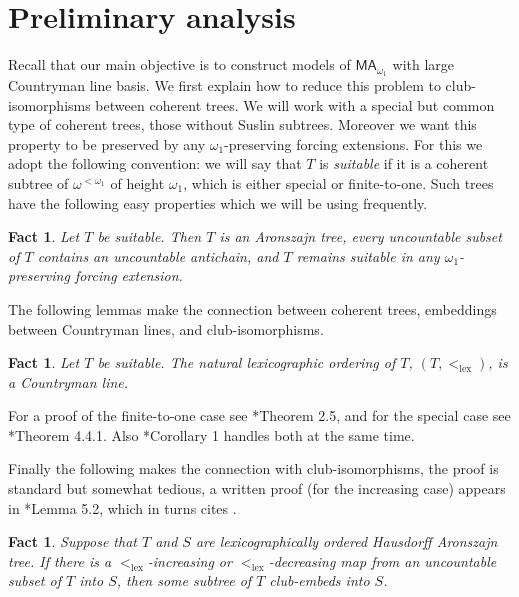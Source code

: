 \documentclass[a4paper,noamsfonts]{amsart}
\newtheorem{fact}[theorem]{Fact}
\theoremstyle{definition}
\newcommand{\MA}{\textsf{MA}}
\newcommand{\1}{\mathbf{1}}
\DeclareMathOperator{\lex}{lex}
\begin{document}
\section{Preliminary analysis}

Recall that our main objective is to construct models of
$\MA_{\omega_{1}}$ with large Countryman line basis. We first explain
how to reduce this problem to club-isomorphisms between coherent
trees.  We will work with a special but common type of coherent trees,
those without Suslin subtrees. Moreover we want this property to be
preserved by any $\omega_{1}$-preserving forcing extensions. For this
we adopt the following convention: we will say that $T$ is
\emph{suitable} if it is a coherent subtree of $\omega^{<\omega_{1}}$ of
height $\omega_{1}$,
which is either special or finite-to-one.
Such trees have the following easy properties which we will be using
frequently.

\begin{fact}
  Let $T$ be suitable. Then $T$ is an Aronszajn tree, every uncountable
  subset of $T$ contains an uncountable antichain, and $T$ remains
  suitable in any $\omega_{1}$-preserving forcing extension.
\end{fact}

The following lemmas make the connection between coherent trees,
embeddings between Countryman lines, and club-isomorphisms.

\begin{fact}
  Let $T$ be suitable. The natural lexicographic ordering
  of $T$, $(T,<_{\lex})$, is a Countryman line.
\end{fact}

For a proof of the finite-to-one case see
\cite{TodorcevicCoherentSeqs}*{Theorem 2.5}, and for
the special case see \cite{TodorcevicWalks}*{Theorem 4.4.1}.
Also \cite{Peng2017}*{Corollary 1} handles both at the same time.

Finally the following makes the connection with club-isomorphisms,
the proof is standard but somewhat tedious, a written proof (for the increasing
case) appears in \cite{Shalev2024}*{Lemma 5.2}, which in turns
cites \cite{PengThesis}.

\begin{fact}\label{lem:club-iso-embedding}
  Suppose that $T$ and $S$ are lexicographically ordered
  Hausdorff Aronszajn tree. If there is
  a $<_{\lex}$-increasing or $<_{\lex}$-decreasing map from
  an uncountable subset of $T$ into $S$, then some
  subtree of $T$ club-embeds into $S$.
\end{fact}
\end{document}
